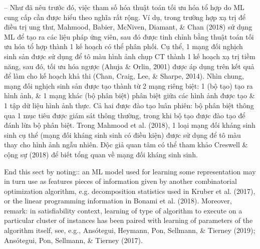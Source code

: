 \documentclass{article}
\begin{document}
\begin{itemize}
\begin{itemize}
\begin{itemize}
            -- Như đã nêu trước đó, việc tham số hóa thuật toán tối ưu hóa tổ hợp do ML cung cấp cần được hiểu theo nghĩa rất rộng. Ví dụ, trong trường hợp xạ trị để điều trị ung thư, Mahmood, Babier, McNiven, Diamant, \& Chan (2018) sử dụng ML để tạo ra các liệu pháp ứng viên, sau đó được tinh chỉnh bằng thuật toán tối ưu hóa tổ hợp thành 1 kế hoạch có thể phân phối. Cụ thể, 1 mạng đối nghịch sinh sản được sử dụng để tô màu hình ảnh chụp CT thành 1 kế hoạch xạ trị tiềm năng, sau đó, tối ưu hóa ngược (Ahuja \& Orlin, 2001) được áp dụng trên kết quả để làm cho kế hoạch khả thi (Chan, Craig, Lee, \& Sharpe, 2014). Nhìn chung, mạng đối nghịch sinh sản được tạo thành từ 2 mạng riêng biệt: 1 (bộ tạo) tạo ra hình ảnh, \& 1 mạng khác (bộ phân biệt) phân biệt giữa các hình ảnh được tạo \& 1 tập dữ liệu hình ảnh thực. Cả hai được đào tạo luân phiên: bộ phân biệt thông qua 1 mục tiêu được giám sát thông thường, trong khi bộ tạo được đào tạo để đánh lừa bộ phân biệt. Trong Mahmood et al. (2018), 1 loại mạng đối kháng sinh sinh cụ thể (mạng đối kháng sinh sinh có điều kiện) được sử dụng để tô màu thay cho hình ảnh ngẫu nhiên. Độc giả quan tâm có thể tham khảo Creswell \& cộng sự (2018) để biết tổng quan về mạng đối kháng sinh sinh.

            End this sect by noting:: an ML model used for learning some representation may in turn use as features pieces of information given by another combinatorial optimization algorithm, e.g. decomposition statistics used in Kruber et al. (2017), or the linear programming information in Bonami et al. (2018). Moreover, remark: in satisfiability context, learning of type of algorithm to execute on a particular cluster of instances has been paired with learning of parameters of the algorithm itself, see, e.g., Ansótegui, Heymann, Pon, Sellmann, \& Tierney (2019); Ansótegui, Pon, Sellmann, \& Tierney (2017).


\end{itemize}
\end{itemize}
\end{itemize}
\end{document}
